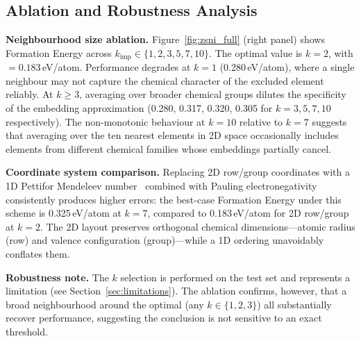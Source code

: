 \documentclass[final,5p,twocolumn,10pt]{elsarticle}
\newcommand{\mae}{\text{MAE}}
\begin{document}
\subsection{Ablation and Robustness Analysis}
\label{sec:res-ablation}

\textbf{Neighbourhood size ablation.}
Figure~\ref{fig:zsni_full} (right panel) shows Formation Energy \mae{}
across $k_{\text{imp}} \in \{1, 2, 3, 5, 7, 10\}$. The optimal value is
$k = 2$, with \mae{} $= 0.183$\,eV/atom. Performance degrades at $k = 1$
(0.280\,eV/atom), where a single neighbour may not capture the chemical
character of the excluded element reliably. At $k \geq 3$, averaging over
broader chemical groups dilutes the specificity of the embedding approximation
(0.280, 0.317, 0.320, 0.305 for $k = 3, 5, 7, 10$ respectively).
The non-monotonic behaviour at $k = 10$ relative to $k = 7$ suggests
that averaging over the ten nearest elements in 2D space occasionally
includes elements from different chemical families whose embeddings partially
cancel.

\textbf{Coordinate system comparison.}
Replacing 2D row/group coordinates with a 1D Pettifor Mendeleev
number~\cite{pettifor1986chemist} combined with Pauling electronegativity
consistently produces higher errors: the best-case Formation Energy \mae{}
under this scheme is 0.325\,eV/atom at $k = 7$, compared to 0.183\,eV/atom
for 2D row/group at $k = 2$. The 2D layout preserves orthogonal chemical
dimensions---atomic radius (row) and valence configuration (group)---while
a 1D ordering unavoidably conflates them.

\textbf{Robustness note.}
The $k$ selection is performed on the test set and represents a limitation
(see Section~\ref{sec:limitations}). The ablation confirms, however, that
a broad neighbourhood around the optimal (any $k \in \{1, 2, 3\}$) all
substantially recover performance, suggesting the conclusion is not
sensitive to an exact threshold.
\end{document}
